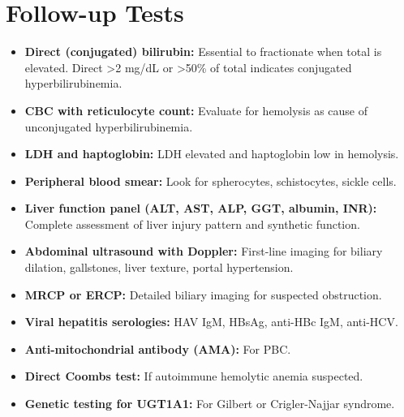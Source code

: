 \section*{Follow-up Tests}
\begin{itemize}
  \item \textbf{Direct (conjugated) bilirubin:} Essential to fractionate when total is elevated. Direct >2 mg/dL or >50\% of total indicates conjugated hyperbilirubinemia.
  \item \textbf{CBC with reticulocyte count:} Evaluate for hemolysis as cause of unconjugated hyperbilirubinemia.
  \item \textbf{LDH and haptoglobin:} LDH elevated and haptoglobin low in hemolysis.
  \item \textbf{Peripheral blood smear:} Look for spherocytes, schistocytes, sickle cells.
  \item \textbf{Liver function panel (ALT, AST, ALP, GGT, albumin, INR):} Complete assessment of liver injury pattern and synthetic function.
  \item \textbf{Abdominal ultrasound with Doppler:} First-line imaging for biliary dilation, gallstones, liver texture, portal hypertension.
  \item \textbf{MRCP or ERCP:} Detailed biliary imaging for suspected obstruction.
  \item \textbf{Viral hepatitis serologies:} HAV IgM, HBsAg, anti-HBc IgM, anti-HCV.
  \item \textbf{Anti-mitochondrial antibody (AMA):} For PBC.
  \item \textbf{Direct Coombs test:} If autoimmune hemolytic anemia suspected.
  \item \textbf{Genetic testing for UGT1A1:} For Gilbert or Crigler-Najjar syndrome.
\end{itemize}

